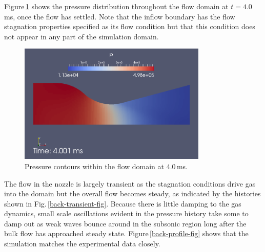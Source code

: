 Figure\,\ref{back-pressure-contours-fig} shows the pressure distribution
throughout the flow domain at $t = 4.0$\,ms, once the flow has settled.
Note that the inflow boundary has the flow stagnation properties specified as its
flow condition but that this condition does not appear in any part of the simulation domain.

\begin{figure}[htbp]
\begin{center}
\includegraphics[width=0.8\textwidth]{../2D/back-nozzle/back-p-field.png}
\end{center}
\caption{Pressure contours within the flow domain at 4.0\,ms.}
\label{back-pressure-contours-fig}
\end{figure}

The flow in the nozzle is largely transient as the stagnation conditions drive gas into the domain
but the overall flow becomes steady, as indicated by the histories
shown in Fig.\,\ref{back-transient-fig}.
Because there is little damping to the gas dynamics, small scale oscillations evident in the pressure
history take some to damp out as weak waves bounce around in the subsonic region long after the bulk flow
has approached steady state.
Figure\,\ref{back-profile-fig} shows that the simulation matches the
experimental data closely.

